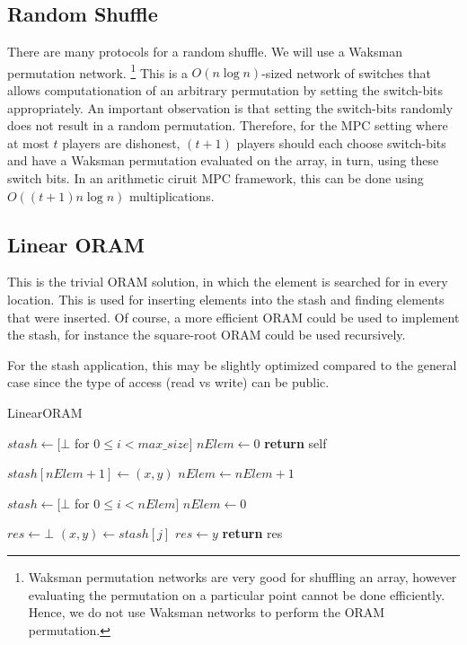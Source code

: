 \subsection{Random Shuffle}

There are many protocols for a random shuffle.
We will use a Waksman permutation network.
\footnote{Waksman permutation networks are very good for shuffling an array,
however evaluating the permutation on a particular point cannot be done
efficiently. Hence, we do not use Waksman networks to perform the ORAM permutation.}
This is a $O(n \log{n})$-sized network of switches that allows computationation
of an arbitrary permutation by setting the switch-bits appropriately.
An important observation is that setting the switch-bits randomly
does not result in a random permutation.
Therefore, for the MPC setting where at most $t$ players are dishonest,
$(t+1)$ players should each choose switch-bits and have a Waksman permutation
evaluated on the array, in turn, using these switch bits.  
In an arithmetic ciruit MPC framework, this can be done using $O( (t+1) n \log{n})$ multiplications.

\subsection{Linear ORAM}

This is the trivial ORAM solution, in which the element is searched for
in every location.
This is used for inserting elements into the stash and finding
elements that were inserted.
Of course, a more efficient ORAM could be used to implement the stash,
for instance the square-root ORAM could be used recursively.

For the stash application, this may be slightly optimized compared to the 
general case since the type of access (read vs write) can be public.

\begin{algorithm}
\caption{LinearORAM}
\label{alg:obliv_set}
\begin{algorithmic}[1]


\State $stash \gets [ \bot $ for $0 \leq i < max\_size]$
\State $nElem \gets 0$
\State \textbf{return} self
\EndProcedure

\State

\State $stash[nElem + 1] \gets (x, y)$
\State $nElem \gets nElem + 1$
\EndProcedure

\State

\State $stash \gets [ \bot $ for $0 \leq i < nElem]$
\State $nElem \gets 0$
\EndProcedure

\State

\State $res \gets \bot$
    \State $(x, y) \gets stash[j]$
        \State $res \gets y$
    \EndOblivIf
\EndFor
\State \textbf{return} res
\EndProcedure

\end{algorithmic}
\end{algorithm}


